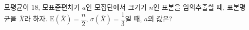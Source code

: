 모평균이 18, 모표준편차가 $a$인 모집단에서 크기가 $n$인 표본을 임의추출할 때, 표본평균을 $\overline{X}$라 하자. $\mathrm{E}(\overline{X})=\dfrac{n}{2}$, $\sigma(\overline{X})=\dfrac{1}{3}$일 때, $a$의 값은?
